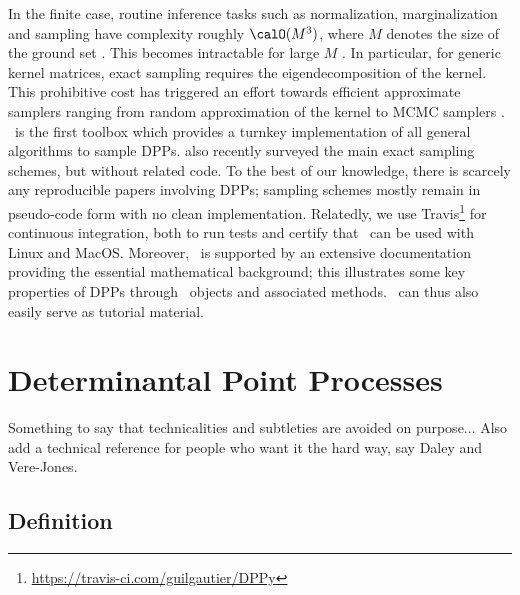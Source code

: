 \documentclass[twoside,11pt]{article}
\begin{document}
  In the finite case, routine inference tasks such as normalization, marginalization and sampling have complexity roughly $\calO(M^3)$, where $M$ denotes the size of the ground set \citep{KuTa12}. This becomes intractable for large $M$ \citep{Gil14}. In particular, for generic kernel matrices, exact sampling requires the eigendecomposition of the kernel. This prohibitive cost has triggered an effort towards efficient approximate samplers ranging from random approximation  of the kernel \citep{AfKuFo13} to MCMC samplers \citep{AnGhRe16, LiJeSr16c, GaBaVa17}.\\

  \DPPy\ is the first toolbox which provides a turnkey implementation of all general algorithms to sample DPPs. \citet{TrBaAm18} also recently surveyed the main exact sampling schemes, but without related code. To the best of our knowledge, there is scarcely any reproducible papers involving DPPs; sampling schemes mostly remain in pseudo-code form with no clean implementation.   \setcounter{footnote}{5}
    Relatedly, we use Travis\footnote{\url{https://travis-ci.com/guilgautier/DPPy}} for continuous integration, both to run tests and certify that \DPPy\ can be used with Linux and MacOS. Moreover, \DPPy\ is supported by an extensive documentation providing the essential mathematical background; this illustrates some key properties of DPPs through \DPPy\ objects and associated methods. \DPPy\ can thus also easily serve as tutorial material.




\section{Determinantal Point Processes} %
\label{sec:determinantal_point_processes}

  Something to say that technicalities and subtleties are avoided on purpose... Also add a technical reference for people who want it the hard way, say Daley and Vere-Jones.

  \subsection{Definition} %
  \label{sub:definition}
\end{document}
